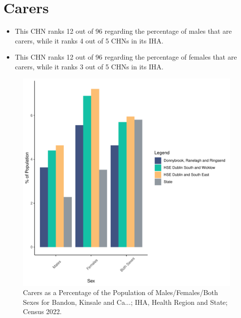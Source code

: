 \documentclass{article}
\begin{document}
\section{Carers}\label{sect:Carers}
\begin{itemize}
\item This CHN ranks  12 out of 96 regarding the percentage of males that are carers, while it ranks   4 out of 5 CHNs in its IHA.
\item This CHN ranks  12 out of 96 regarding the percentage of females that are carers, while it ranks   3 out of 5 CHNs in its IHA.
\end{itemize}
\begin{figure}[H]
	\centering
	\includegraphics[width = 150mm]{../figures/CareED.pdf}
	\caption{Carers as a Percentage of the Population of Males/Females/Both Sexes for Bandon, Kinsale and Ca...; IHA, Health Region and State; Census 2022.}
	\label{fig:2ae19629-1a6a-13a3-e055-000000000001}
	\end{figure}
\end{document}
